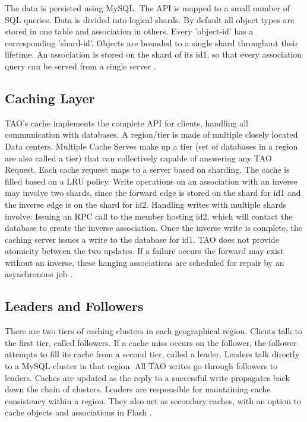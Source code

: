 \documentclass[9pt,twocolumn,twoside]{../../styles/osajnl}
\begin{document}
The data is persisted using MySQL. The API is mapped to a small number of SQL queries. Data is divided into logical shards. By default all object types are stored in one table and association in others. Every 'object-id' has a corresponding 'shard-id'. Objects are bounded to a single shard throughout their lifetime. An association is stored on the shard of its id1, so that every association query can be served from a single server \cite{www-tao4}.

\subsection{Caching Layer}
TAO’s cache implements the complete API for clients, handling all communication with databases. A region/tier is made of multiple closely located Data centers. Multiple Cache Serves make up a tier (set of databases in a region are also called a tier) that can collectively capable of answering any TAO Request. Each cache request maps to a server based on sharding. The cache is filled based on a LRU policy. Write operations on an association with an inverse may involve two shards, since the forward edge is stored on the shard for id1 and the inverse edge is on the shard for id2. Handling writes with multiple shards involve: Issuing an RPC call to the member hosting id2, which will contact the database to create the inverse association. Once the inverse write is complete, the caching server issues a write to the database for id1. TAO does not provide atomicity between the two updates. If a failure occurs the forward may exist without an inverse, these hanging associations are scheduled for repair by an asynchronous job \cite{www-tao4}.

\subsection {Leaders and Followers}
There are two tiers of caching clusters in each geographical region. Clients talk to the first tier, called followers. If a cache miss occurs on the follower, the follower attempts to fill its cache from a second tier, called a leader. Leaders talk directly to a MySQL cluster in that region. All TAO writes go through followers to leaders. Caches are updated as the reply to a successful write propagates back down the chain of clusters. Leaders are responsible for maintaining cache consistency within a region. They also act as secondary caches, with an option to cache objects and associations in Flash \cite{www-tao2}.
\end{document}
